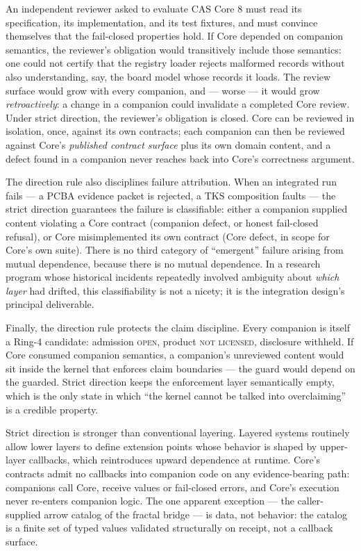 An independent reviewer asked to evaluate CAS Core 8 must read its specification, its implementation, and its test fixtures, and must convince themselves that the fail-closed properties hold. If Core depended on companion semantics, the reviewer's obligation would transitively include those semantics: one could not certify that the registry loader rejects malformed records without also understanding, say, the board model whose records it loads. The review surface would grow with every companion, and --- worse --- it would grow \emph{retroactively}: a change in a companion could invalidate a completed Core review. Under strict direction, the reviewer's obligation is closed. Core can be reviewed in isolation, once, against its own contracts; each companion can then be reviewed against Core's \emph{published contract surface} plus its own domain content, and a defect found in a companion never reaches back into Core's correctness argument.

The direction rule also disciplines failure attribution. When an integrated run fails --- a PCBA evidence packet is rejected, a TKS composition faults --- the strict direction guarantees the failure is classifiable: either a companion supplied content violating a Core contract (companion defect, or honest fail-closed refusal), or Core misimplemented its own contract (Core defect, in scope for Core's own suite). There is no third category of ``emergent'' failure arising from mutual dependence, because there is no mutual dependence. In a research program whose historical incidents repeatedly involved ambiguity about \emph{which layer} had drifted, this classifiability is not a nicety; it is the integration design's principal deliverable.

Finally, the direction rule protects the claim discipline. Every companion is itself a Ring-4 candidate: admission \textsc{open}, product \textsc{not licensed}, disclosure withheld. If Core consumed companion semantics, a companion's unreviewed content would sit inside the kernel that enforces claim boundaries --- the guard would depend on the guarded. Strict direction keeps the enforcement layer semantically empty, which is the only state in which ``the kernel cannot be talked into overclaiming'' is a credible property.

\begin{remark}\label{integ:rem:notlayering}
Strict direction is stronger than conventional layering. Layered systems routinely allow lower layers to define extension points whose behavior is shaped by upper-layer callbacks, which reintroduces upward dependence at runtime. Core's contracts admit no callbacks into companion code on any evidence-bearing path: companions call Core, receive values or fail-closed errors, and Core's execution never re-enters companion logic. The one apparent exception --- the caller-supplied arrow catalog of the fractal bridge --- is data, not behavior: the catalog is a finite set of typed values validated structurally on receipt, not a callback surface.
\end{remark}

